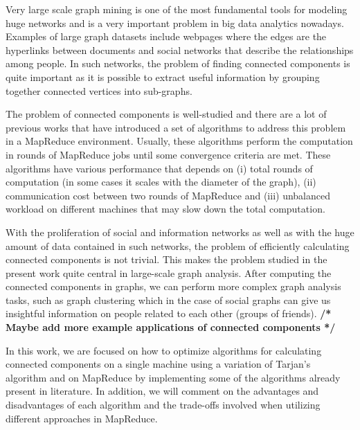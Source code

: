 Very large scale graph mining is one of the most fundamental tools for modeling huge networks and is a very important problem in big data analytics nowadays. Examples of large graph datasets include webpages where the edges are the hyperlinks between documents and social networks that describe the relationships among people. In such networks, the problem of finding connected components is quite important as it is possible to extract useful information by grouping together connected vertices into sub-graphs.

The problem of connected components is well-studied and there are a lot of previous works that have introduced a set of algorithms to address this problem in a MapReduce \cite{mapreduce} environment. Usually, these algorithms perform the computation in rounds of MapReduce jobs until some convergence criteria are met. These algorithms have various performance that depends on (i) total rounds of computation (in some cases it scales with the diameter of the graph), (ii) communication cost between two rounds of MapReduce and (iii) unbalanced workload on different machines that may slow down the total computation.

With the proliferation of social and information networks as well as with the huge amount of data contained in such networks, the problem of efficiently calculating connected components is not trivial. This makes the problem studied in the present work quite central in large-scale graph analysis. After computing the connected components in graphs, we can perform more complex graph analysis tasks, such as graph clustering which in the case of social graphs can give us insightful information on people related to each other (\eg groups of friends). \textbf{/* Maybe add more example applications of connected components */}

In this work, we are focused on how to optimize algorithms for calculating connected components on a single machine using a variation of Tarjan's algorithm and on MapReduce by implementing some of the algorithms already present in literature. In addition, we will comment on the advantages and disadvantages of each algorithm and the trade-offs involved when utilizing different approaches in MapReduce.


